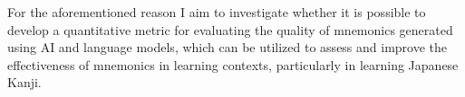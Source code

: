 For the aforementioned reason I aim to investigate whether it is possible to develop a quantitative metric for evaluating the quality of mnemonics generated using AI and language models, which can be utilized to assess and improve the effectiveness of mnemonics in learning contexts, particularly in learning Japanese Kanji.